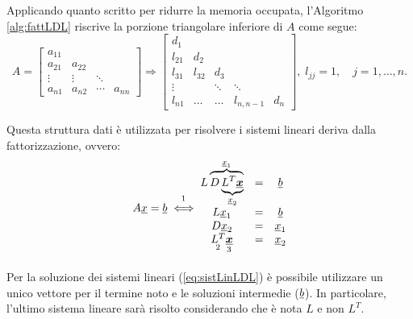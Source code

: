 \begin{remark}
    Applicando quanto scritto per ridurre la memoria occupata, l'Algoritmo \ref{alg:fattLDL} riscrive la porzione triangolare inferiore di $A$ come segue:
    \begin{equation*}
        A=
        \begin{bmatrix}
          a_{11} \\
          a_{21} & a_{22}\\
          \vdots & \vdots & \ddots\\
          a_{n1} & a_{n2} & \cdots & a_{nn}
        \end{bmatrix} \Rightarrow
        \begin{bmatrix}
            d_1\\
            l_{21} & d_2\\
            l_{31} & l_{32} & d_3\\
            \vdots & &\ddots & \ddots\\
            l_{n1} & \hdots & \hdots & l_{n,n-1} & d_n
        \end{bmatrix},\; l_{jj}=1,\quad j = 1,\hdots, n.
    \end{equation*}
    
    Questa struttura dati è utilizzata per risolvere i sistemi lineari deriva dalla fattorizzazione, ovvero:
    \begin{equation}\label{eq:sistLinLDL}
        A\uline x = \uline b\overset{\footnotemark}{\iff}
        \begin{matrix}
            L\overbrace{D\underbrace{L^T\boldsymbol{\uline x}}_{\uline x_2}}^{\uline x_1} &=& \uline b\\
            L \uline x_1 &=& \uline b\\
            D\uline x_2 &=& \uline x_1\\
            \underset{\footnotemark}{L^T} \underset{\footnotemark}{\boldsymbol{\uline x}} &=& \uline x_2
        \end{matrix}
    \end{equation}
\end{remark}

\addtocounter{footnote}{-2}



Per la soluzione dei sistemi lineari (\ref{eq:sistLinLDL}) è possibile utilizzare un unico vettore per il termine noto e le soluzioni intermedie ($\uline b$). In particolare, l'ultimo sistema lineare sarà risolto considerando che è nota $L$ e non $L^T$.

